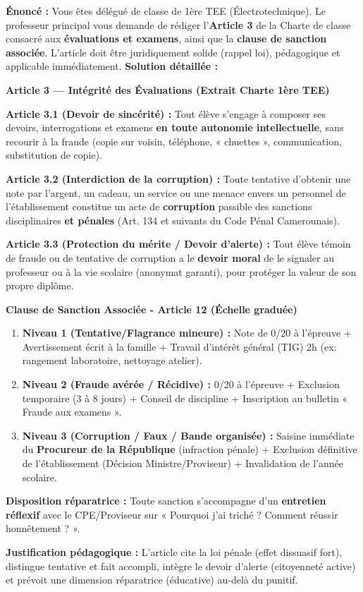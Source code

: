 \documentclass[11pt]{article}
\newcommand{\cle}[1]{{\popxbold\color{popdark}#1}}
\begin{document}
\begin{exoresolu}
    \textbf{Énoncé :} Vous êtes délégué de classe de 1ère TEE (Électrotechnique). Le professeur principal vous demande de rédiger l'\textbf{Article 3} de la Charte de classe consacré aux \textbf{évaluations et examens}, ainsi que la \textbf{clause de sanction associée}. L'article doit être juridiquement solide (rappel loi), pédagogique et applicable immédiatement.
    \tcblower
    \textbf{Solution détaillée :}

    \textbf{Article 3 — Intégrité des Évaluations (Extrait Charte 1ère TEE)}

    \textbf{Article 3.1 (Devoir de sincérité) :} Tout élève s'engage à composer ses devoirs, interrogations et examens \textbf{en toute autonomie intellectuelle}, sans recourir à la fraude (copie sur voisin, téléphone, « chuettes », communication, substitution de copie).

    \textbf{Article 3.2 (Interdiction de la corruption) :} Toute tentative d'obtenir une note par l'argent, un cadeau, un service ou une menace envers un personnel de l'établissement constitue un acte de \textbf{corruption} passible des sanctions disciplinaires \textbf{et pénales} (Art. 134 et suivants du Code Pénal Camerounais).

    \textbf{Article 3.3 (Protection du mérite / Devoir d'alerte) :} Tout élève témoin de fraude ou de tentative de corruption a le \textbf{devoir moral} de le signaler au professeur ou à la vie scolaire (anonymat garanti), pour protéger la valeur de son propre diplôme.

    \textbf{Clause de Sanction Associée - Article 12 (Échelle graduée)}

    \begin{enumerate}
        \item \textbf{Niveau 1 (Tentative/Flagrance mineure) :} Note de 0/20 à l'épreuve + Avertissement écrit à la famille + Travail d'intérêt général (TIG) 2h (ex: rangement laboratoire, nettoyage atelier).
        \item \textbf{Niveau 2 (Fraude avérée / Récidive) :} 0/20 à l'épreuve + Exclusion temporaire (3 à 8 jours) + Conseil de discipline + Inscription au bulletin « Fraude aux examens ».
        \item \textbf{Niveau 3 (Corruption / Faux / Bande organisée) :} Saisine immédiate du \textbf{Procureur de la République} (infraction pénale) + Exclusion définitive de l'établissement (Décision Ministre/Proviseur) + Invalidation de l'année scolaire.
    \end{enumerate}
    \textbf{Disposition réparatrice :} Toute sanction s'accompagne d'un \textbf{entretien réflexif} avec le CPE/Proviseur sur « Pourquoi j'ai triché ? Comment réussir honnêtement ? ».

    \textbf{Justification pédagogique :} L'article cite la \cle{loi pénale} (effet dissuasif fort), distingue \cle{tentative} et \cle{fait accompli}, intègre le \cle{devoir d'alerte} (citoyenneté active) et prévoit une \cle{dimension réparatrice} (éducative) au-delà du punitif.
\end{exoresolu}
\end{document}
